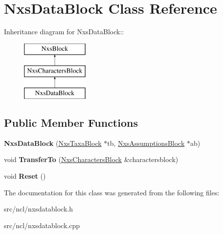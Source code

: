 \hypertarget{classNxsDataBlock}{
\section{NxsDataBlock Class Reference}
\label{classNxsDataBlock}
}
Inheritance diagram for NxsDataBlock::\begin{figure}[H]
\begin{center}
\leavevmode
\includegraphics[height=3cm]{classNxsDataBlock}
\end{center}
\end{figure}
\subsection*{Public Member Functions}
\begin{DoxyCompactItemize}
\item 
\hypertarget{classNxsDataBlock_a48ab9ef4ea76a56b5eee04984362f5b7}{
{\bfseries NxsDataBlock} (\hyperlink{classNxsTaxaBlock}{NxsTaxaBlock} $\ast$tb, \hyperlink{classNxsAssumptionsBlock}{NxsAssumptionsBlock} $\ast$ab)}
\label{classNxsDataBlock_a48ab9ef4ea76a56b5eee04984362f5b7}

\item 
\hypertarget{classNxsDataBlock_a6362a21b1e29eab0db7c41792dc5c339}{
void {\bfseries TransferTo} (\hyperlink{classNxsCharactersBlock}{NxsCharactersBlock} \&charactersblock)}
\label{classNxsDataBlock_a6362a21b1e29eab0db7c41792dc5c339}

\item 
\hypertarget{classNxsDataBlock_afbb0d98c0a459bb77b318c314c80dff1}{
void {\bfseries Reset} ()}
\label{classNxsDataBlock_afbb0d98c0a459bb77b318c314c80dff1}

\end{DoxyCompactItemize}


The documentation for this class was generated from the following files:\begin{DoxyCompactItemize}
\item 
src/ncl/nxsdatablock.h\item 
src/ncl/nxsdatablock.cpp\end{DoxyCompactItemize}
